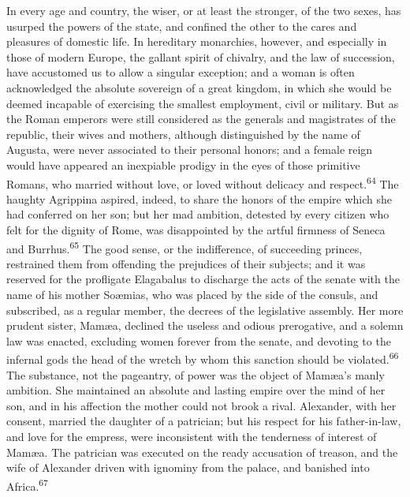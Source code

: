 In every age and country, the wiser, or at least the stronger, of
the two sexes, has usurped the powers of the state, and confined
the other to the cares and pleasures of domestic life. In
hereditary monarchies, however, and especially in those of modern
Europe, the gallant spirit of chivalry, and the law of
succession, have accustomed us to allow a singular exception; and
a woman is often acknowledged the absolute sovereign of a great
kingdom, in which she would be deemed incapable of exercising the
smallest employment, civil or military. But as the Roman emperors
were still considered as the generals and magistrates of the
republic, their wives and mothers, although distinguished by the
name of Augusta, were never associated to their personal honors;
and a female reign would have appeared an inexpiable prodigy in
the eyes of those primitive Romans, who married without love, or
loved without delicacy and respect.\textsuperscript{64} The haughty Agrippina
aspired, indeed, to share the honors of the empire which she had
conferred on her son; but her mad ambition, detested by every
citizen who felt for the dignity of Rome, was disappointed by the
artful firmness of Seneca and Burrhus.\textsuperscript{65} The good sense, or the
indifference, of succeeding princes, restrained them from
offending the prejudices of their subjects; and it was reserved
for the profligate Elagabalus to discharge the acts of the senate
with the name of his mother Soæmias, who was placed by the side
of the consuls, and subscribed, as a regular member, the decrees
of the legislative assembly. Her more prudent sister, Mamæa,
declined the useless and odious prerogative, and a solemn law was
enacted, excluding women forever from the senate, and devoting to
the infernal gods the head of the wretch by whom this sanction
should be violated.\textsuperscript{66} The substance, not the pageantry, of power
was the object of Mamæa’s manly ambition. She maintained an
absolute and lasting empire over the mind of her son, and in his
affection the mother could not brook a rival. Alexander, with her
consent, married the daughter of a patrician; but his respect for
his father-in-law, and love for the empress, were inconsistent
with the tenderness of interest of Mamæa. The patrician was
executed on the ready accusation of treason, and the wife of
Alexander driven with ignominy from the palace, and banished into
Africa.\textsuperscript{67}


